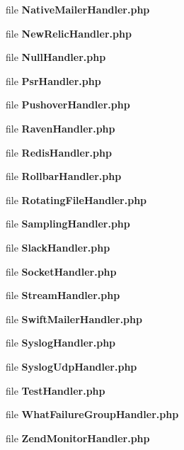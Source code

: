 \begin{DoxyCompactItemize}
\item 
file {\bf Native\+Mailer\+Handler.\+php}
\item 
file {\bf New\+Relic\+Handler.\+php}
\item 
file {\bf Null\+Handler.\+php}
\item 
file {\bf Psr\+Handler.\+php}
\item 
file {\bf Pushover\+Handler.\+php}
\item 
file {\bf Raven\+Handler.\+php}
\item 
file {\bf Redis\+Handler.\+php}
\item 
file {\bf Rollbar\+Handler.\+php}
\item 
file {\bf Rotating\+File\+Handler.\+php}
\item 
file {\bf Sampling\+Handler.\+php}
\item 
file {\bf Slack\+Handler.\+php}
\item 
file {\bf Socket\+Handler.\+php}
\item 
file {\bf Stream\+Handler.\+php}
\item 
file {\bf Swift\+Mailer\+Handler.\+php}
\item 
file {\bf Syslog\+Handler.\+php}
\item 
file {\bf Syslog\+Udp\+Handler.\+php}
\item 
file {\bf Test\+Handler.\+php}
\item 
file {\bf What\+Failure\+Group\+Handler.\+php}
\item 
file {\bf Zend\+Monitor\+Handler.\+php}
\end{DoxyCompactItemize}

